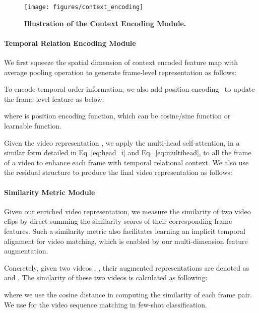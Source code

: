 \documentclass{article}
\begin{document}
\begin{figure}[t]
    \centering
    \texttt{[image: figures/context\_encoding]}
\caption{\textbf{Illustration of the Context Encoding Module.}}\vspace{-3mm}
    \label{fig:context_encoding}
\end{figure}	
\paragraph{Temporal Relation Encoding Module} We first squeeze the spatial dimension of context encoded feature map  with average pooling operation to generate frame-level representation as follows:

To encode temporal order information, we also add position encoding~\cite{vaswani2017attention} to update the frame-level feature  as below:

where  is position encoding function, which can be cosine/sine function or learnable function.


Given the video representation , we apply the multi-head self-attention, in a similar form detailed in Eq~\ref{eq:head_i} and Eq.~\ref{eq:multihead}, to all the frame of a video to enhance each frame with temporal relational context. We also use the residual structure to produce the final video representation as follows:



\paragraph{Similarity Metric Module}
Given our enriched video representation, we measure the similarity of two video clips by direct summing the similarity scores of their corresponding frame features. Such a similarity metric also facilitates learning an implicit temporal alignment for video matching, which is enabled by our multi-dimension feature augmentation. 

Concretely,  given two videos , , their augmented representations are denoted as  and  . The similarity of these two videos is calculated as following:

where we use the cosine distance in computing the similarity of each frame pair. We use  for the video sequence matching in few-shot classification.
\end{document}

